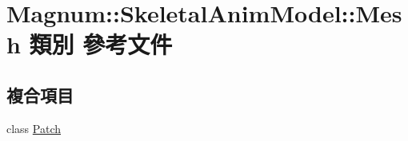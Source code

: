 \hypertarget{class_magnum_1_1_skeletal_anim_model_1_1_mesh}{}\section{Magnum\+:\+:Skeletal\+Anim\+Model\+:\+:Mesh 類別 參考文件}
\label{class_magnum_1_1_skeletal_anim_model_1_1_mesh}
\subsection*{複合項目}
\begin{DoxyCompactItemize}
\item 
class \hyperlink{class_magnum_1_1_skeletal_anim_model_1_1_mesh_1_1_patch}{Patch}
\end{DoxyCompactItemize}
